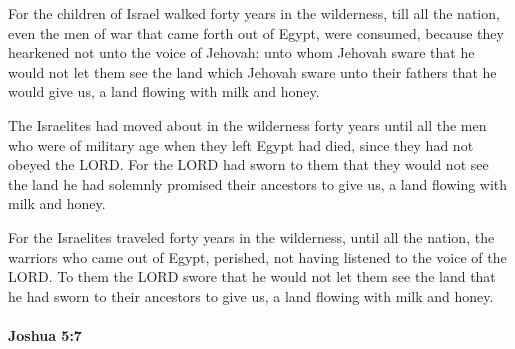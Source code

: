 			\begin{versebox}
					\item[BHS] 
					\item[ASV] For the children of Israel walked forty years in the wilderness, till all the nation, even the men of war that came forth out of Egypt, were consumed, because they hearkened not unto the voice of Jehovah: unto whom Jehovah sware that he would not let them see the land which Jehovah sware unto their fathers that he would give us, a land flowing with milk and honey.
					\item[NIV] The Israelites had moved about in the wilderness forty years until all the men who were of military age when they left Egypt had died, since they had not obeyed the LORD. For the LORD had sworn to them that they would not see the land he had solemnly promised their ancestors to give us, a land flowing with milk and honey.
					\item[NRSV] For the Israelites traveled forty years in the wilderness, until all the nation, the warriors who came out of Egypt, perished, not having listened to the voice of the LORD. To them the LORD swore that he would not let them see the land that he had sworn to their ancestors to give us, a land flowing with milk and honey.
			\end{versebox}

		\paragraph{Joshua 5:7} %
			\label{JOSHUA-5-7}

